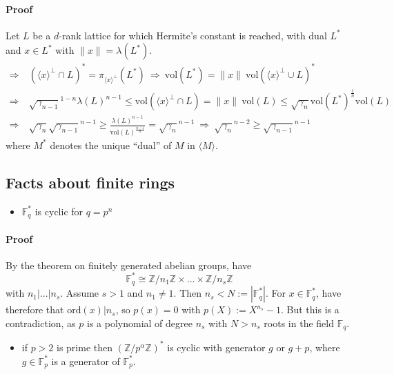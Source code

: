 \documentclass{scrartcl}
\newcommand{\Z}{\mathbb{Z}}
\newcommand{\vol}{\mathrm{vol}}
\begin{document}
\paragraph{Proof} Let $L$ be a $d$-rank lattice for which Hermite's constant is reached, with dual $L^*$ and $x \in L^*$ with $\|x\| = \lambda(L^*)$.
\begin{equation}
    \begin{split}
        \Rightarrow& \ \left(\langle x \rangle ^\perp \cap L\right)^* = \pi_{\langle x \rangle ^\perp} (L^*) \ \Rightarrow \ \vol(L^*) = \|x\| \ \vol\left(\langle x \rangle^\perp \cup L\right)^* \\
        \Rightarrow& \ \sqrt{\gamma_{n-1}}^{1-n} \lambda(L)^{n-1} \leq \vol\left(\langle x \rangle^\perp \cap L\right) = \|x\| \ \vol(L) \leq \sqrt{\gamma_n} \vol(L^*)^{\frac 1 n} \vol(L) \\
        \Rightarrow& \ \sqrt{\gamma_n} \sqrt{\gamma_{n - 1}}^{n - 1} \geq \frac {\lambda(L)^{n-1}} {\vol(L)^{\frac {n-1} n}} = \sqrt{\gamma_n}^{n-1} \ \Rightarrow \ \sqrt{\gamma_n}^{n-2} \geq \sqrt{\gamma_{n-1}}^{n-1}
    \end{split} \nonumber
\end{equation}
where $M^*$ denotes the unique ``dual'' of $M$ in $\langle M \rangle$.

\subsection{Facts about finite rings}
\begin{itemize}
    \item $\mathbb{F}_q^*$ is cyclic for $q = p^n$
\end{itemize}
\paragraph{Proof} By the theorem on finitely generated abelian groups, have
\begin{equation}
    \mathbb{F}_q^* \cong \Z/n_1\Z \times ... \times \Z/n_s\Z \nonumber
\end{equation}
with $n_1 | ... | n_s$. Assume $s > 1$ and $n_1 \neq 1$. Then $n_s < N := |\mathbb{F}_q^*|$. For $x \in \mathbb{F}_q^*$, have therefore that $\mathrm{ord}(x) | n_s$, so $p(x) = 0$ with $p(X) := X^{n_s} - 1$. 
But this is a contradiction, as $p$ is a polynomial of degree $n_s$ with $N > n_s$ roots in the field $\mathbb{F}_q$.
\begin{itemize}
    \item if $p > 2$ is prime then $(\Z/p^\alpha\Z)^*$ is cyclic with generator $g$ or $g + p$, where $g \in \mathbb{F}_p^*$ is a generator of $\mathbb{F}_p^*$.
\end{itemize}
\end{document}
